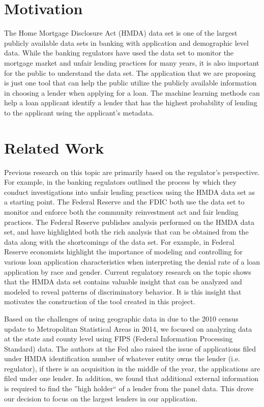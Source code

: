 \documentclass[conference,compsoc]{IEEEtran}
\begin{document}
\section{Motivation}

The Home Mortgage Disclosure Act (HMDA) data set is one of the largest publicly available data sets in banking with application and demographic level data.  While the banking regulators have used the data set to monitor the mortgage market and unfair lending practices for many years, it is also important for the public to understand the data set.  The application that we are proposing is just one tool that can help the public utilize the publicly available information in choosing a lender when applying for a loan.  The machine learning methods can help a loan applicant identify a lender that has the highest probability of lending to the applicant using the applicant’s metadata.  


\section{Related Work}

Previous research on this topic are primarily based on the regulator’s perspective.  For example, in \cite{FDIC} the banking regulators outlined the process by which they conduct investigations into unfair lending practices using the HMDA data set as a starting point.  The Federal Reserve and the FDIC both use the data set to monitor and enforce both the community reinvestment act and fair lending practices. 
The Federal Reserve publishes analysis performed on the HMDA data set, and have highlighted both the rich analysis that can be obtained from the data along with the shortcomings of the data set.  For example, in \cite{FED} Federal Reserve economists highlight the importance of modeling and controlling for various loan application characteristics when interpreting the denial rate of a loan application by race and gender. 
Current regulatory research on the topic shows that the HMDA data set contains valuable insight that can be analyzed and modeled to reveal patterns of discriminatory behavior. It is this insight that motivates the construction of the tool created in this project.

Based on the challenges of using geographic data in \cite{FED} due to the 2010 census update to Metropolitan Statistical Areas in 2014, we focused on analyzing data at the state and county level using FIPS (Federal Information Processing Standard) data.  The authors at the Fed \cite{FED} also raised the issue of applications filed under HMDA identification number of whatever entity owns the lender (i.e. regulator), if there is an acquisition in the middle of the year, the applications are filed under one lender.  In addition, we found that additional external information is required to find the ''high holder`` of a lender from the panel data.  This drove our decision to focus on the largest lenders in our application.  
\end{document}
